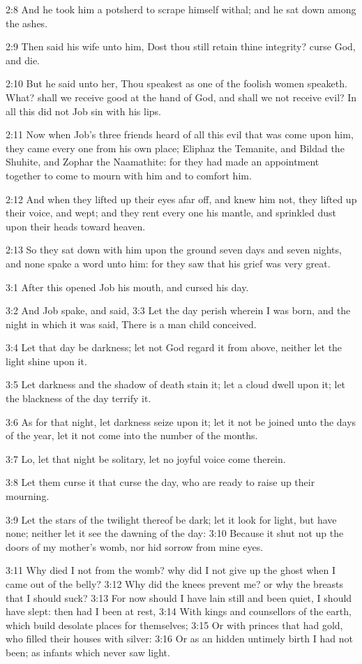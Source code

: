 2:8 And he took him a potsherd to scrape himself withal; and he sat
down among the ashes.

2:9 Then said his wife unto him, Dost thou still retain thine
integrity?  curse God, and die.

2:10 But he said unto her, Thou speakest as one of the foolish women
speaketh. What? shall we receive good at the hand of God, and shall we
not receive evil? In all this did not Job sin with his lips.

2:11 Now when Job's three friends heard of all this evil that was come
upon him, they came every one from his own place; Eliphaz the
Temanite, and Bildad the Shuhite, and Zophar the Naamathite: for they
had made an appointment together to come to mourn with him and to
comfort him.

2:12 And when they lifted up their eyes afar off, and knew him not,
they lifted up their voice, and wept; and they rent every one his
mantle, and sprinkled dust upon their heads toward heaven.

2:13 So they sat down with him upon the ground seven days and seven
nights, and none spake a word unto him: for they saw that his grief
was very great.

3:1 After this opened Job his mouth, and cursed his day.

3:2 And Job spake, and said, 3:3 Let the day perish wherein I was
born, and the night in which it was said, There is a man child
conceived.

3:4 Let that day be darkness; let not God regard it from above,
neither let the light shine upon it.

3:5 Let darkness and the shadow of death stain it; let a cloud dwell
upon it; let the blackness of the day terrify it.

3:6 As for that night, let darkness seize upon it; let it not be
joined unto the days of the year, let it not come into the number of
the months.

3:7 Lo, let that night be solitary, let no joyful voice come therein.

3:8 Let them curse it that curse the day, who are ready to raise up
their mourning.

3:9 Let the stars of the twilight thereof be dark; let it look for
light, but have none; neither let it see the dawning of the day: 3:10
Because it shut not up the doors of my mother's womb, nor hid sorrow
from mine eyes.

3:11 Why died I not from the womb? why did I not give up the ghost
when I came out of the belly?  3:12 Why did the knees prevent me? or
why the breasts that I should suck?  3:13 For now should I have lain
still and been quiet, I should have slept: then had I been at rest,
3:14 With kings and counsellors of the earth, which build desolate
places for themselves; 3:15 Or with princes that had gold, who filled
their houses with silver: 3:16 Or as an hidden untimely birth I had
not been; as infants which never saw light.

